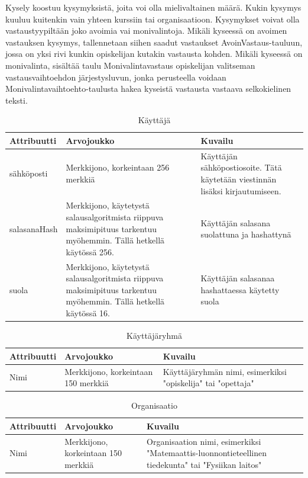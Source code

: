 \documentclass[12pt,a4paper,titlepage]{article}
\begin{document}
Kysely koostuu kysymyksistä, joita voi olla mielivaltainen määrä. Kukin kysymys kuuluu kuitenkin vain yhteen kurssiin tai organisaatioon. Kysymykset voivat olla vastaustyypiltään joko avoimia vai monivalintoja. Mikäli kyseessä on avoimen vastauksen kysymys, tallennetaan siihen saadut vastaukset AvoinVastaus-tauluun, jossa on yksi rivi kunkin opiskelijan kutakin vastausta kohden. Mikäli kyseessä on monivalinta, sisältää taulu Monivalintavastaus opiskelijan valitseman vastausvaihtoehdon järjestysluvun, jonka perusteella voidaan Monivalintavaihtoehto-taulusta hakea kyseistä vastausta vastaava selkokielinen teksti.


\begin{table}[h]
\caption{Käyttäjä} \label{tietokohde_ensimmainen}
\begin{tabularx}{\textwidth}{ | l X X |}
  \hline
  Attribuutti & Arvojoukko & Kuvailu \\
  \hline
  sähköposti & Merkkijono, korkeintaan 256 merkkiä & Käyttäjän sähköpostiosoite. Tätä käytetään viestinnän lisäksi kirjautumiseen. \\
  salasanaHash & Merkkijono, käytetystä salausalgoritmista riippuva maksimipituus tarkentuu myöhemmin. Tällä hetkellä käytössä 256. & Käyttäjän salasana suolattuna ja hashattynä\\
  suola & Merkkijono, käytetystä salausalgoritmista riippuva maksimipituus tarkentuu myöhemmin. Tällä hetkellä käytössä 16. & Käyttäjän salasanaa hashattaessa käytetty suola \\
  \hline
\end{tabularx}
\end{table}

\begin{table}[h]
\caption{Käyttäjäryhmä}
\begin{tabularx}{\textwidth}{|  l X X  |}
  \hline
  Attribuutti & Arvojoukko & Kuvailu \\
  \hline
   Nimi & Merkkijono, korkeintaan 150 merkkiä & Käyttäjäryhmän nimi, esimerkiksi "opiskelija" tai "opettaja" \\
  \hline
\end{tabularx}
\end{table}

\begin{table}[h]
\caption{Organisaatio}
\begin{tabularx}{\textwidth}{ |  l X X  |}
  \hline
  Attribuutti & Arvojoukko & Kuvailu \\
  \hline
  Nimi & Merkkijono, korkeintaan 150 merkkiä & Organisaation nimi, esimerkiksi "Matemaattis-luonnontieteellinen tiedekunta" tai "Fysiikan laitos" \\
  \hline
\end{tabularx}
\end{table}
\end{document}
